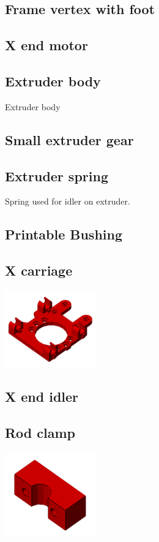 \documentclass[11pt]{article}
\begin{document}
\hypertarget{thing_frame-vertex-foot}{\subsection{Frame vertex with foot}}

\hypertarget{thing_x-end-motor}{\subsection{X end motor}}

\hypertarget{thing_extruder-body}{\subsection{Extruder body}}
Extruder body

\hypertarget{thing_small-gear}{\subsection{Small extruder gear}}

\hypertarget{thing_extruder-spring}{\subsection{Extruder spring}}
Spring used for idler on extruder.

\hypertarget{thing_printable-bushing}{\subsection{Printable Bushing}}

\hypertarget{thing_x-carriage}{\subsection{X carriage}}
\includegraphics[width=4cm]{images/x-carriage.png}

\hypertarget{thing_x-end-idler}{\subsection{X end idler}}

\hypertarget{thing_rod-clamp}{\subsection{Rod clamp}}
\includegraphics[width=4cm]{images/rod-clamp.png}
\end{document}
